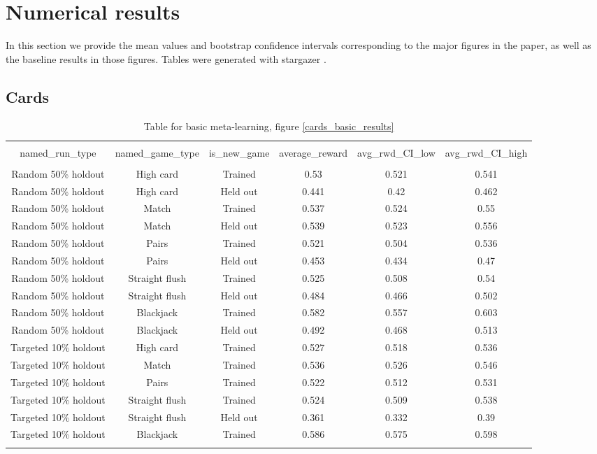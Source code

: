 \documentclass{article}
\begin{document}
\section{Numerical results}
In this section we provide the mean values and bootstrap confidence intervals corresponding to the major figures in the paper, as well as the baseline results in those figures. Tables were generated with stargazer \citep{Hlavac2018}.


\subsection{Cards}
\begin{table}[H]
\scriptsize
\centering
\begin{tabular}{@{\extracolsep{5pt}} cccccc}
\\[-1.8ex]\hline
\hline \\[-1.8ex]
named\_run\_type & named\_game\_type & is\_new\_game & average\_reward & avg\_rwd\_CI\_low & avg\_rwd\_CI\_high \\
\hline \\[-1.8ex]
Random 50\% holdout & High card & Trained & 0.53 & 0.521 & 0.541 \\
Random 50\% holdout & High card & Held out & 0.441 & 0.42 & 0.462 \\
Random 50\% holdout & Match & Trained & 0.537 & 0.524 & 0.55 \\
Random 50\% holdout & Match & Held out & 0.539 & 0.523 & 0.556 \\
Random 50\% holdout & Pairs & Trained & 0.521 & 0.504 & 0.536 \\
Random 50\% holdout & Pairs & Held out & 0.453 & 0.434 & 0.47 \\
Random 50\% holdout & Straight flush & Trained & 0.525 & 0.508 & 0.54 \\
Random 50\% holdout & Straight flush & Held out & 0.484 & 0.466 & 0.502 \\
Random 50\% holdout & Blackjack & Trained & 0.582 & 0.557 & 0.603 \\
Random 50\% holdout & Blackjack & Held out & 0.492 & 0.468 & 0.513 \\
Targeted 10\% holdout & High card & Trained & 0.527 & 0.518 & 0.536 \\
Targeted 10\% holdout & Match & Trained & 0.536 & 0.526 & 0.546 \\
Targeted 10\% holdout & Pairs & Trained & 0.522 & 0.512 & 0.531 \\
Targeted 10\% holdout & Straight flush & Trained & 0.524 & 0.509 & 0.538 \\
Targeted 10\% holdout & Straight flush & Held out & 0.361 & 0.332 & 0.39 \\
Targeted 10\% holdout & Blackjack & Trained & 0.586 & 0.575 & 0.598 \\
\hline \\[-1.8ex]
\end{tabular}
\caption{Table for basic meta-learning, figure \ref{cards_basic_results}}
\end{table}
\end{document}
